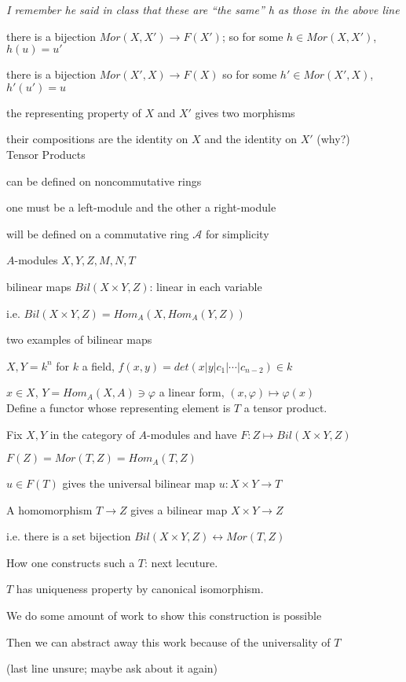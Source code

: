 \documentclass[12pt]{article}
\begin{document}
\textit{I remember he said in class that these are ``the same'' h as those in the above line}

there is a bijection $Mor(X, X') \to F(X')$; so for some $h \in Mor(X, X')$, $h(u) = u'$

there is a bijection $Mor(X', X) \to F(X)$ so for some $h' \in Mor(X', X)$, $h'(u') = u$

the representing property of $X$ and $X'$ gives two morphisms

their compositions are the identity on $X$ and the identity on $X'$ (why?)\\

\noindent
Tensor Products

can be defined on noncommutative rings

one must be a left-module and the other a right-module

will be defined on a commutative ring $\mathcal{A}$ for simplicity

$A$-modules $X, Y, Z, M, N, T$

bilinear maps $Bil(X \times Y, Z)$: linear in each variable

i.e. $Bil(X \times Y, Z) = Hom_A(X, Hom_A(Y, Z))$

\noindent
two examples of bilinear maps

$X, Y = k^n$ for $k$ a field, $f(x, y) = det(x | y | c_1 | \cdots | c_{n - 2}) \in k$

$x \in X$, $Y = Hom_A(X, A) \ni \varphi$ a linear form, $(x, \varphi) \mapsto \varphi(x)$\\

\noindent
Define a functor whose representing element is $T$ a tensor product.

Fix $X, Y$ in the category of $A$-modules and have $F: Z \mapsto Bil(X \times Y, Z)$

$F(Z) = Mor(T, Z) = Hom_A(T, Z)$

$u \in F(T)$ gives the universal bilinear map $u: X \times Y \to T$

A homomorphism $T \to Z$ gives a bilinear map $X \times Y \to Z$

i.e. there is a set bijection $Bil(X \times Y, Z) \leftrightarrow Mor(T, Z)$

How one constructs such a $T$: next lecuture.

\noindent
$T$ has uniqueness property by canonical isomorphism.

We do some amount of work to show this construction is possible

Then we can abstract away this work because of the universality of $T$

(last line unsure; maybe ask about it again)
\end{document}

